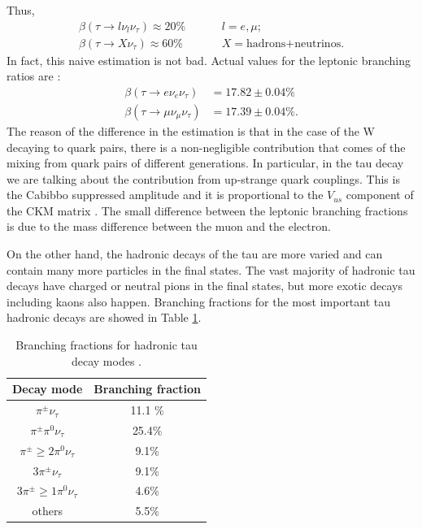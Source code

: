 Thus, 
\begin{align}
\beta(\tau\to l\nu_l\nu_\tau)\approx 20\%& \hspace{1cm}l=e,\mu;
\\
\beta(\tau\to X\nu_\tau)\approx 60\%& \hspace{1cm} X=\text{hadrons+neutrinos}.
\end{align}
In fact, this naive estimation is not bad. Actual values for the leptonic branching ratios are \cite{PhysRevD.98.030001}:
\begin{align}
\beta(\tau\to e\nu_e\nu_\tau)&=17.82\pm 0.04\%
\label{eq6}
\\
\beta(\tau\to \mu\nu_\mu\nu_\tau)&=17.39\pm 0.04\%.
\end{align}
The reason of the difference in the estimation is that in the case of the W decaying to quark pairs, there is a non-negligible contribution that comes of the mixing from quark pairs of different generations. In particular, in the tau decay we are talking about the contribution from up-strange quark couplings. This is the Cabibbo suppressed amplitude and it is proportional to the $V_{us}$ component of the CKM matrix \cite{Davier:2005xq}. The small difference between the leptonic branching fractions is due to the mass difference between the muon and the electron.

On the other hand, the hadronic decays of the tau are more varied and can contain many more particles in the final states. The vast majority of hadronic tau decays have charged or neutral pions in the final states, but more exotic decays including kaons also happen. Branching fractions for the most important tau hadronic decays are showed in Table \ref{Table1}.
\begin{table}[]
	\centering
\begin{tabular}{|c|c|}
	\hline
	Decay mode                     & Branching fraction \\ \hline
	$\pi^\pm \nu_\tau$             & 11.1 \%            \\ \hline
	$\pi^\pm \pi^0 \nu_\tau$       & 25.4\%             \\ \hline
	$\pi^\pm \geq 2\pi^0 \nu_\tau$ & 9.1\%               \\ \hline
	$3\pi^\pm \nu_\tau$            & 9.1\%               \\ \hline
	$3\pi^\pm \geq 1\pi^0 \nu_\tau$& 4.6\%               \\ \hline
	others						   & 5.5\%               \\ \hline
\end{tabular}
	\caption{Branching fractions for hadronic tau decay modes \cite{PhysRevD.98.030001}.}
	\label{Table1}
\end{table}

